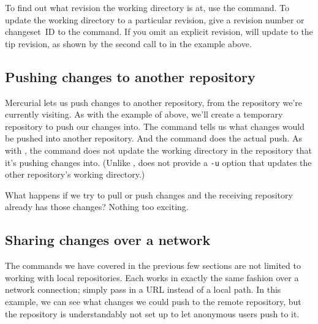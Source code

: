 To find out what revision the working directory is at, use the
 command.
To update the working directory to a particular revision, give a
revision number or changeset~ID to the  command.
If you omit an explicit revision,  will update to the
tip revision, as shown by the second call to  in the
example above.

\subsection{Pushing changes to another repository}

Mercurial lets us push changes to another repository, from the
repository we're currently visiting.  As with the example of
 above, we'll create a temporary repository to push our
changes into.
The  command tells us what changes would be pushed
into another repository.
And the  command does the actual push.
As with , the  command does not update the
working directory in the repository that it's pushing changes into.
(Unlike ,  does not provide a \texttt{-u}
option that updates the other repository's working directory.)

What happens if we try to pull or push changes and the receiving
repository already has those changes?  Nothing too exciting.

\subsection{Sharing changes over a network}

The commands we have covered in the previous few sections are not
limited to working with local repositories.  Each works in exactly the
same fashion over a network connection; simply pass in a URL instead
of a local path.
In this example, we can see what changes we could push to the remote
repository, but the repository is understandably not set up to let
anonymous users push to it.

